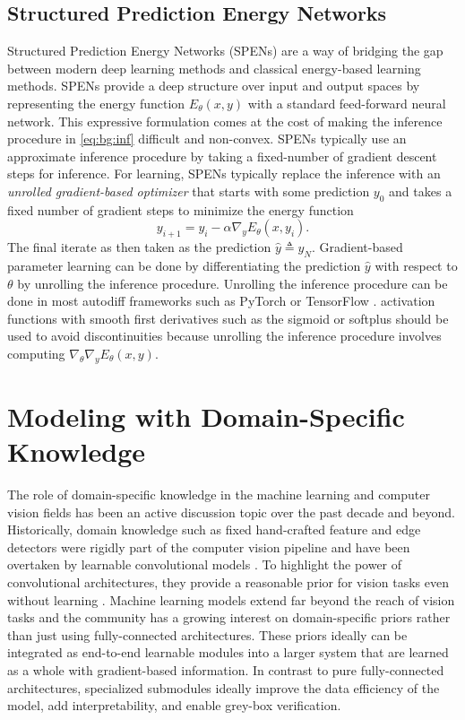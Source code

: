 \subsection{Structured Prediction Energy Networks}
\label{sec:bg:spens}
Structured Prediction Energy Networks (SPENs)
\citep{belanger2016structured,belanger2017end,belanger2017deep}
are a way of bridging the gap between modern deep
learning methods and classical energy-based learning
methods.
SPENs provide a deep structure over input and output spaces
by representing the energy function $E_\theta(x,y)$ with
a standard feed-forward neural network.
This expressive formulation comes at the cost of making
the inference procedure in \cref{eq:bg:inf} difficult
and non-convex.
SPENs typically use an approximate inference procedure
by taking a fixed-number of gradient descent steps
for inference.
For learning, SPENs typically replace the inference with
an \emph{unrolled gradient-based optimizer}
that starts with some prediction $y_0$ and
takes a fixed number of gradient steps to minimize
the energy function
$$y_{i+1} = y_i - \alpha \nabla_y E_\theta(x,y_i).$$
The final iterate as then taken as the prediction
$\hat y \triangleq y_N$.
Gradient-based parameter learning can be done by
differentiating the prediction $\hat y$ with respect
to $\theta$ by unrolling the inference procedure.
Unrolling the inference procedure
can be done in most autodiff frameworks such as
PyTorch \citep{paszke2017automatic}
or TensorFlow \citep{abadi2016tensorflow}.
activation functions with smooth first derivatives
such as the sigmoid or softplus \citep{glorot2011deep}
should be used to avoid discontinuities because
unrolling the inference procedure involves computing
$\nabla_\theta \nabla_y E_\theta(x,y)$.

\section{Modeling with Domain-Specific Knowledge}
\label{sec:bg:dsn}
The role of domain-specific knowledge in the machine learning
and computer vision fields has been an active discussion topic
over the past decade and beyond.
Historically, domain knowledge such as fixed hand-crafted
feature and edge detectors were rigidly part of the
computer vision pipeline and have been overtaken by
learnable convolutional models \citet{lecun1998mnist,krizhevsky2012imagenet}.
To highlight the power of convolutional architectures, they
provide a reasonable prior for vision tasks even without
learning \citep{ulyanov2018deep}.
Machine learning models extend far beyond the reach
of vision tasks and the community has a growing interest
on domain-specific priors rather than just using
fully-connected architectures.
These priors ideally can be integrated as end-to-end
learnable modules into a larger system that are
learned as a whole with gradient-based information.
In contrast to pure fully-connected architectures,
specialized submodules ideally improve the data
efficiency of the model, add interpretability,
and enable grey-box verification.

